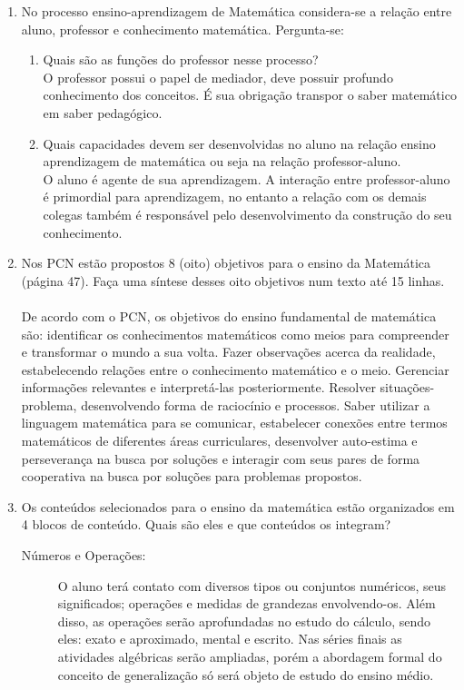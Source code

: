 \documentclass[a4paper, 12pt]{article}
\begin{document}
\begin{enumerate}
\item No processo ensino-aprendizagem de Matemática considera-se a relação entre aluno, professor e conhecimento matemática. Pergunta-se: 
  \begin{enumerate}
  \item Quais são as funções do professor nesse processo? \\
    O professor possui o papel de mediador, deve possuir profundo conhecimento dos conceitos. É sua obrigação transpor o saber matemático em saber pedagógico.
   \item Quais capacidades devem ser desenvolvidas no aluno na relação ensino aprendizagem de matemática ou seja na relação professor-aluno. \\
    O aluno é agente de sua aprendizagem. A interação entre professor-aluno é primordial para aprendizagem, no entanto a relação com os demais colegas também é responsável pelo desenvolvimento da construção do seu conhecimento.
  \end{enumerate}
\item Nos PCN estão propostos 8 (oito) objetivos para o ensino da Matemática (página 47). Faça uma síntese desses oito objetivos num texto até 15 linhas. \\ \\
 De acordo com o PCN, os objetivos do ensino fundamental de matemática são: identificar os conhecimentos matemáticos como meios para compreender e transformar o mundo a sua volta. Fazer observações acerca da realidade, estabelecendo relações entre o conhecimento matemático e o meio. Gerenciar informações relevantes e interpretá-las posteriormente. Resolver situações-problema, desenvolvendo forma de raciocínio e processos. Saber utilizar a linguagem matemática para se comunicar, estabelecer conexões entre termos matemáticos de diferentes áreas curriculares, desenvolver auto-estima e perseverança na busca por soluções e interagir com seus pares de forma cooperativa na busca por soluções para problemas propostos.
 \item Os conteúdos selecionados para o ensino da matemática estão organizados em 4 blocos de conteúdo. Quais são eles e que conteúdos os integram? 
   \begin{description}
   \item[Números e Operações:] O aluno terá contato com diversos tipos ou conjuntos numéricos, seus significados; operações e medidas de grandezas envolvendo-os. Além disso, as operações serão aprofundadas no estudo do cálculo, sendo eles: exato e aproximado, mental e escrito. Nas séries finais as atividades algébricas serão ampliadas, porém a abordagem formal do conceito de generalização só será objeto de estudo do ensino médio.

\end{description}
\end{enumerate}
\end{document}
